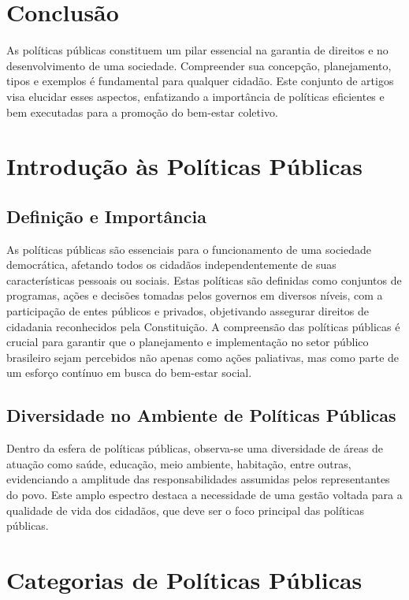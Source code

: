 \documentclass[
   article,       
   12pt,          
   oneside,       
   a4paper,       
   english,       
   brazil,        
   sumario=tradicional
   ]{abntex2}
\begin{document}
\section{Conclusão}
As políticas públicas constituem um pilar essencial na garantia de direitos e no desenvolvimento de uma sociedade. Compreender sua concepção, planejamento, tipos e exemplos é fundamental para qualquer cidadão. Este conjunto de artigos visa elucidar esses aspectos, enfatizando a importância de políticas eficientes e bem executadas para a promoção do bem-estar coletivo.
\section{Introdução às Políticas Públicas}
\subsection{Definição e Importância}
As políticas públicas são essenciais para o funcionamento de uma sociedade democrática, afetando todos os cidadãos independentemente de suas características pessoais ou sociais. Estas políticas são definidas como conjuntos de programas, ações e decisões tomadas pelos governos em diversos níveis, com a participação de entes públicos e privados, objetivando assegurar direitos de cidadania reconhecidos pela Constituição. A compreensão das políticas públicas é crucial para garantir que o planejamento e implementação no setor público brasileiro sejam percebidos não apenas como ações paliativas, mas como parte de um esforço contínuo em busca do bem-estar social. 

\subsection{Diversidade no Ambiente de Políticas Públicas}
Dentro da esfera de políticas públicas, observa-se uma diversidade de áreas de atuação como saúde, educação, meio ambiente, habitação, entre outras, evidenciando a amplitude das responsabilidades assumidas pelos representantes do povo. Este amplo espectro destaca a necessidade de uma gestão voltada para a qualidade de vida dos cidadãos, que deve ser o foco principal das políticas públicas.


\section{Categorias de Políticas Públicas}
\end{document}
